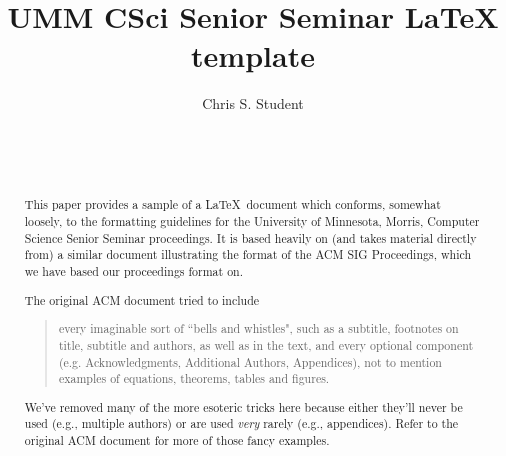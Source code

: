 \documentclass{sig-alternate}
\begin{document}

\title{UMM CSci Senior Seminar LaTeX template}


\author{
\alignauthor
Chris S. Student\\
	\\
	\\
	\\
}

\maketitle
\begin{abstract}
This paper provides a sample of a \LaTeX\ document which conforms,
somewhat loosely, to the formatting guidelines for the University of
Minnesota, Morris, Computer Science Senior Seminar proceedings.
It is based heavily on (and takes material directly from) a similar document 
illustrating the format of the ACM SIG Proceedings, which we have based our
proceedings format on.

The original ACM document tried to include
\begin{quote}
every imaginable sort
of ``bells and whistles", such as a subtitle, footnotes on
title, subtitle and authors, as well as in the text, and
every optional component (e.g. Acknowledgments, Additional
Authors, Appendices), not to mention examples of
equations, theorems, tables and figures.
\end{quote}

We've removed many of the more esoteric tricks here because either
they'll never be used (e.g., multiple authors) or are used \emph{very}
rarely (e.g., appendices). Refer to the original ACM document for more
of those fancy examples.
\end{abstract}
\end{document}
